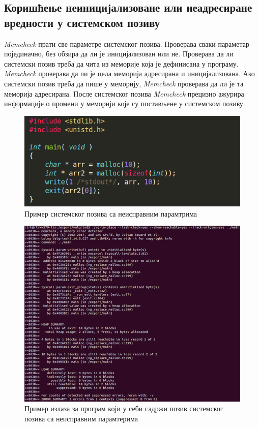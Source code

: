 \documentclass[12pt,oneside]{memoir}
\begin{document}
\subsection{Коришћење неиницијализоване или неадресиране вредности у системском позиву}

\indent \textit{Memcheck} прати све параметре системског позива.  Проверава сваки параметар појединачно, без обзира да ли је иницијализован или не. Проверава да ли системски позив треба да чита из меморије која је дефинисана у програму. \textit{Memcheck} проверава да ли је цела меморија адресирана и иницијализована. Ако системски позив треба да пише у меморију, \textit{Memcheck} проверава да ли је та меморија адресирана. После системског позива \textit{Memcheck} прецизно ажурира информације о промени у меморији које су постављене у системском позиву.

\begin{figure}[h!]
\begin{center}
\includegraphics[scale=0.75]{slika3.png}
\end{center}
\caption{Пример системског позива са неисправним парамтрима}
\label{fig:main1}
\end{figure}



\begin{figure}[h!]
\begin{center}
\includegraphics[scale=0.75]{slika4.png}
\end{center}
\caption{Пример излаза за програм који у себи садржи позив системског позива са неисправним парамтерима}
\label{fig:memcheck1}
\end{figure}
\end{document}
